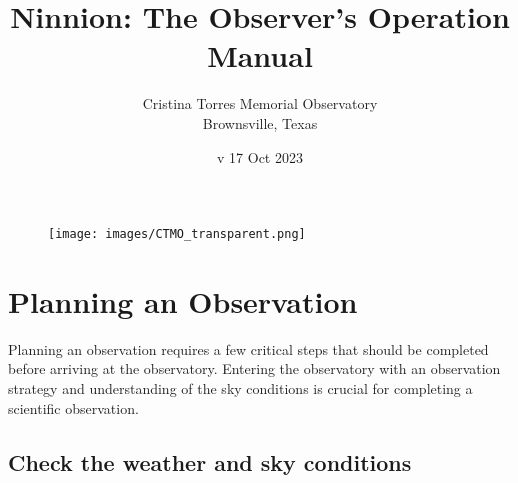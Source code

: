 \documentclass{article}
\title{Ninnion: The Observer's Operation Manual}
\author{Cristina Torres Memorial Observatory \\
	Brownsville, Texas}
\date{v 17 Oct 2023}
\begin{document}
	
	\maketitle
	
	\begin{figure}[b]
		\centering
		\texttt{[image: images/CTMO\_transparent.png]}
	\end{figure}
	
	\newpage
	\tableofcontents
	
	\newpage
	\section{Planning an Observation}
	\label{sec:planning-an-observation}
	
	Planning an observation requires a few critical steps that should be completed before arriving at the observatory. Entering the observatory with an observation strategy and understanding of the sky conditions is crucial for completing a scientific observation.
	
	\subsection{Check the weather and sky conditions}
	\label{sec:check-the-weather-and-sky-conditions}
	
\end{document}
